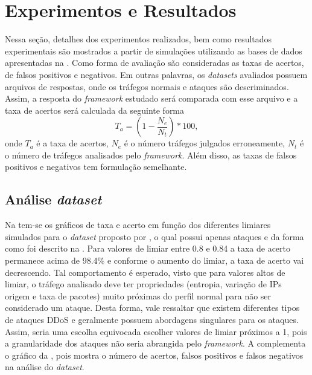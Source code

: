 \chapter[Resultados]{Experimentos e Resultados}
\label{resultados}
Nessa seção, detalhes dos experimentos realizados, bem como resultados experimentais são mostrados a partir de simulações utilizando as bases de dados apresentadas na . Como forma de avaliação são consideradas as taxas de acertos, de falsos positivos e negativos. Em outras palavras, os \textit{datasets} avaliados possuem arquivos de respostas, onde os tráfegos normais e ataques são descriminados. Assim, a resposta do \textit{framework} estudado será comparada com esse arquivo e a taxa de acertos será calculada da seguinte forma
\begin{equation}
	T_a = \left(1 - \frac{N_e}{N_t}\right)* 100,
\end{equation}
onde $T_a$ é a taxa de acertos, $N_e$ é o número tráfegos julgados erroneamente, $N_t$ é o número de tráfegos analisados pelo \textit{framework}. Além disso, as taxas de falsos positivos e negativos tem formulação semelhante.

\section{Análise \textit{dataset}\cite{DataMining}}  
Na  tem-se os gráficos de taxa e acerto em função dos diferentes limiares simulados para o \textit{dataset} proposto por \cite{DataMining}, o qual possui apenas ataques e da forma como foi descrito na . Para valores de limiar entre 0.8 e 0.84 a taxa de acerto permanece acima de 98.4\% e conforme o aumento do limiar, a taxa de acerto vai decrescendo. Tal comportamento é esperado, visto que para valores altos de limiar, o tráfego analisado deve ter propriedades (entropia, variação de IPs origem e taxa de pacotes) muito próximas do perfil normal para não ser considerado um ataque. Desta forma, vale ressaltar que existem diferentes tipos de ataques DDoS e geralmente possuem abordagens singulares para os ataques. Assim, seria uma escolha equivocada escolher valores de limiar próximos a 1, pois a granularidade dos ataques não seria abrangida pelo \textit{framework}. A  complementa o gráfico da , pois mostra o número de acertos, falsos positivos e falsos negativos na análise do \textit{dataset}.

